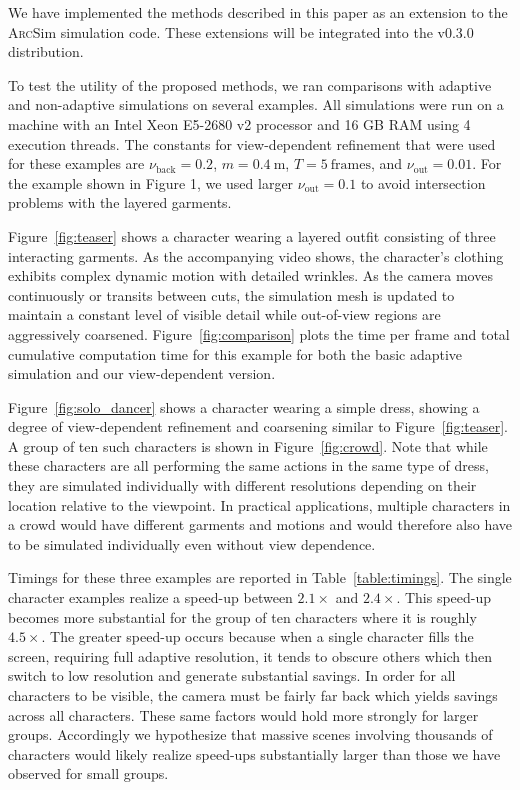 \documentclass[10pt,journal,compsoc,twoside]{TexInputs/IEEEtran}
\newcommand{\arcsim}{\textsc{Arc}Sim\xspace}
\begin{document}
We have implemented the methods described in this paper as an extension to the
\arcsim simulation code.  
These extensions will be integrated into the v0.3.0 distribution.

To test the utility of the proposed methods, we ran comparisons with adaptive and
non-adaptive simulations on several
examples. All simulations were run on a machine with an Intel Xeon E5-2680 v2
processor and 16 GB RAM using 4 execution threads.
The constants for view-dependent refinement that were used for these examples are
$\nu_{\text{back}} = 0.2$, $m = 0.4\ \mathrm{m}$, $T = 5\ \mathrm{frames}$, and
$\nu_{\text{out}} = 0.01$.  For the example shown in Figure 1, we used larger
$\nu_{\text{out}} = 0.1$ to avoid intersection problems with the layered garments.

Figure~\ref{fig:teaser} shows a character wearing a layered outfit consisting
of three interacting garments. As the accompanying video shows, the
character's clothing exhibits complex dynamic motion with detailed wrinkles. As
the camera moves continuously or transits between cuts, the simulation mesh
is updated to maintain a constant level of visible detail while out-of-view
regions are aggressively coarsened. Figure~\ref{fig:comparison} plots the time
per frame and total cumulative computation time for this example for both the
basic adaptive simulation and our view-dependent version.

Figure~\ref{fig:solo_dancer} shows a character wearing a simple
dress, showing a degree of view-dependent refinement and coarsening similar to Figure~\ref{fig:teaser}.
A group of ten such characters is shown in
Figure~\ref{fig:crowd}. Note that while these characters are all
performing the same actions in the same type of dress, they are simulated individually
with different resolutions depending on their location relative to the viewpoint.
In practical applications, multiple characters in a crowd
would have different garments and motions and would therefore also have to be simulated
individually even without view dependence.

Timings for these three examples are reported in Table~\ref{table:timings}. The single character examples
realize a speed-up between $2.1\times$ and $2.4\times$. This speed-up becomes
more substantial for the group of ten characters where it is roughly
$4.5\times$. The greater speed-up occurs because when a single character fills
the screen, requiring full adaptive resolution, it tends to obscure others
which then switch to low resolution and generate substantial savings. In order
for all characters to be visible, the camera must be fairly far back which
yields savings across all characters. These same factors would hold more
strongly for larger groups. Accordingly we hypothesize that massive scenes
involving thousands of characters would likely realize speed-ups substantially
larger than those we have observed for small groups.
\end{document}
